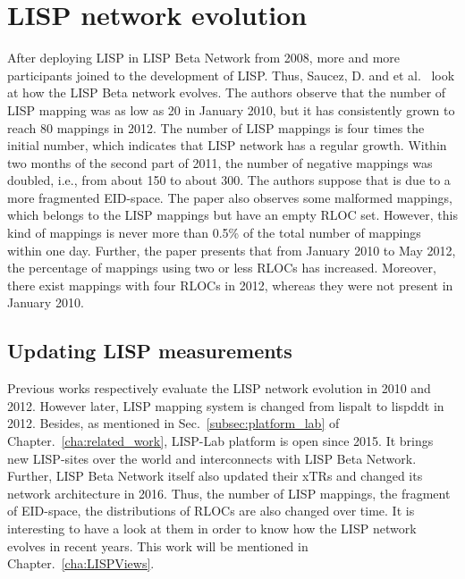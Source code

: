 \section{LISP network evolution}
\label{sec:evolution}
After deploying LISP in LISP Beta Network from 2008, more and more participants joined to the development of LISP. %
Thus, Saucez, D. and et al.~\cite{lispCCR} look at how the LISP Beta network evolves. The authors observe that the number of LISP mapping was as low as 20 in January 2010, but it has consistently grown to reach 80 mappings in 2012. The number of LISP mappings is four times the initial number, which indicates that LISP network has a regular growth. Within two months of the second part of 2011, the number of negative mappings was doubled, i.e., from about 150 to about 300. The authors suppose that is due to a more fragmented EID-space. The paper also observes some malformed mappings, which belongs to the LISP mappings but have an empty RLOC set. However, this kind of mappings is never more than 0.5\% of the total number of mappings within one day. Further, the paper presents that from January 2010 to May 2012, the percentage of mappings using two or less RLOCs has increased. Moreover, there exist mappings with four RLOCs in 2012, whereas they were not present in January 2010.

\subsection{Updating LISP measurements}
\label{subsec:evolution_missing}
Previous works respectively evaluate the LISP network evolution in 2010 and 2012. However later, LISP mapping system is changed from \acrshort{lispalt} to \acrshort{lispddt} in 2012. Besides, as mentioned in Sec.~\ref{subsec:platform_lab} of Chapter.~\ref{cha:related_work}, LISP-Lab platform is open since 2015. It brings new LISP-sites over the world and interconnects with LISP Beta Network. Further, LISP Beta Network itself also updated their xTRs and changed its network architecture in 2016. Thus, the number of LISP mappings, the fragment of EID-space, the distributions of RLOCs are also changed over time. It is interesting to have a look at them in order to know how the LISP network evolves in recent years. This work will be mentioned in Chapter.~\ref{cha:LISPViews}.

